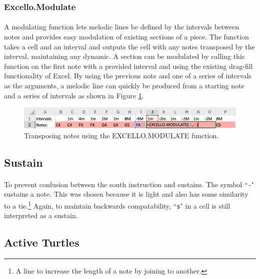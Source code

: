 \subsubsection{Excello.Modulate}

\paragraph{} A modulating function lets melodic lines be defined by the intervals between notes and provides easy modulation of existing sections of a piece. The function takes a cell and an interval and outputs the cell with any notes transposed by the interval, maintaining any dynamic. A section can be modulated by calling this function on the first note with a provided interval and using the existing drag-fill functionality of Excel. By using the previous note and one of a series of intervals as the arguments, a melodic line can quickly be produced from a starting note and a series of intervals as shown in Figure \ref{implementation:modulateFunction}.

\begin{figure}[tbh]
\centerline{\includegraphics[width=150mm]{figs/modulateFunction.png}}
\caption{Transposing notes using the EXCELLO.MODULATE function.}
\label{implementation:modulateFunction}
\end{figure}


\subsection{Sustain}

\paragraph{} To prevent confusion between the south instruction and sustains. The symbol ``\texttt{-}" sustains a note. This was chosen because it is light and also has some similarity to a tie.\footnote{A line to increase the length of a note by joining to another.} Again, to maintain backwards compatability, ``\texttt{s}" in a cell is still interpreted as a sustain.

\subsection{Active Turtles}


